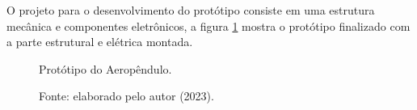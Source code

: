 O projeto para o desenvolvimento do protótipo consiste em uma estrutura mecânica e componentes eletrônicos, a figura \ref{fig3:image_01} mostra o protótipo finalizado com a parte estrutural e elétrica montada.


\begin{figure}[!h]
	\centering
	\caption{Protótipo do Aeropêndulo.}
	\caption*{Fonte: elaborado pelo autor (2023).}
	\label{fig3:image_01}
\end{figure}
